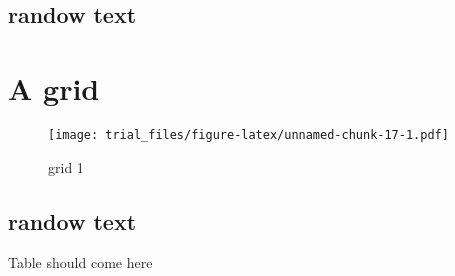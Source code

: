 \documentclass[]{article}
\begin{document}
\subsection{randow text}\label{randow-text-9}

\lipsum

\section{A grid}\label{a-grid-4}

\begin{figure}[htbp]
\centering
\texttt{[image: trial\_files/figure-latex/unnamed-chunk-17-1.pdf]}
\caption{grid 1}
\end{figure}

\subsection{randow text}\label{randow-text-10}

\lipsum

Table should come here
\end{document}
